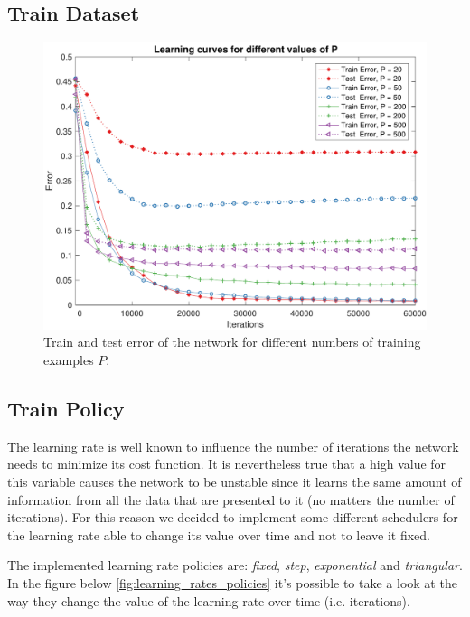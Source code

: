 \subsection{Train Dataset}
\begin{figure}[t]
	\centering
	\includegraphics[width=\columnwidth]{figures/error_ps}
    \caption{Train and test error of the network for different numbers of training examples $P$.}
	\label{fig:ps}
\end{figure}


\subsection{Train Policy}
The learning rate is well known to influence the number of iterations the network needs to minimize
its cost function. It is nevertheless true that a high value for this variable causes the network to
be unstable since it learns the same amount of information from all the data that are presented to it (no matters the number of iterations).
For this reason we decided to implement some different schedulers for the learning rate able to change its
value over time and not to leave it fixed.

The implemented learning rate policies are: \textit{fixed}, \textit{step}, \textit{exponential} and \textit{triangular}.
In the figure below \cref{fig:learning_rates_policies} it's possible to take a look at the way they change the value of the learning rate over time (i.e. iterations).



